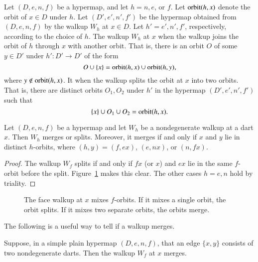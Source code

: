 \begin{definition}\label{def:merge-split} 
Let $(D,e,n,f)$ be a hypermap, and let $h=n,e$, or $f$.  Let ${\operatorname{orbit}}(h,x)$
denote the orbit of $x\in D$ under $h$.  Let $(D',e',n',f')$ be the hypermap obtained
from $(D,e,n,f)$ by the walkup $W_h$ at $x\in D$.
Let $h'=e',n',f'$, respectively, according to the choice of $h$.
The walkup $W_h$ at $x$  when the walkup joins the
orbit of $h$ through $x$ with another orbit.  That is, there is an orbit $O$ of some
$y\in D'$ under $h':D'\to D'$ of the form
\begin{displaymath}
O \cup\{x\} = {\operatorname{orbit}}(h,x) \cup {\operatorname{orbit}}(h,y),
\end{displaymath}
where $y\not\in {\operatorname{orbit}}(h,x)$.
It 
when the walkup splits the orbit at $x$ into two orbits.  That is, there are 
distinct orbits $O_1,O_2$ under $h'$ in the hypermap $(D',e',n',f')$ such that
\begin{displaymath}
\{x\}\cup O_1\cup O_2 = {\operatorname{orbit}}(h,x).
\end{displaymath}
%
%
%
\end{definition}

\begin{lemma}\label{lemma:merge-split} 
  Let $(D,e,n,f)$ be a hypermap and let $W_h$ be a nondegenerate
  walkup at a dart $x$.  Then $W_h$ merges or splits. Moreover, it merges if
  and only if $x$ and $y$ lie in distinct $h$-orbits, where
  $(h,y)=(f,e x)$,  $(e,n x)$, or $(n,f x)$.
\end{lemma}

\begin{proof} The walkup $W_f$ splits if and only if $f x$ 
(or $x$)
and $e x$ lie in the same $f$-orbit before the split. 
Figure~\ref{fig:split} makes this clear.
The other cases $h=e,n$ hold by triality.
\end{proof}


\begin{figure}[htb]
\centering
{}
\caption{The face walkup at $x$ mixes $f$-orbits.  If it mixes a
single orbit, the orbit splits. If it mixes two separate orbits, the
orbits merge. }
\label{fig:split}
\end{figure}

The following is a useful way to tell if a walkup merges.


\begin{lemma}\label{lemma:ng-merge}  
Suppose, in a simple plain hypermap $(D,e,n,f)$, that an edge $\{x,y\}$ consists
of two nondegenerate darts.  Then the walkup $W_f$ 
at $x$ merges.
\end{lemma}
%

